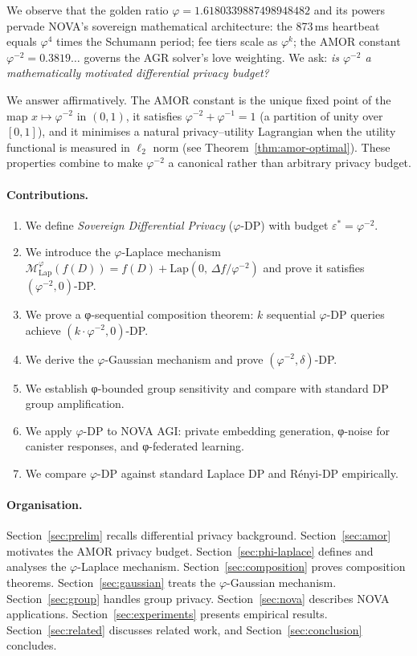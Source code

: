 \documentclass[12pt]{article}
\newcommand{\AMOR}{\varphi^{-2}}
\newcommand{\PHI}{\varphi}
\newcommand{\PHIINV}{\varphi^{-1}}
\newcommand{\Lap}{\mathrm{Lap}}
\newcommand{\eps}{\varepsilon}
\newcommand{\Mech}{\mathcal{M}}
\newcommand{\phiDP}{\varphi\text{-DP}}
\newcommand{\Sens}{\Delta}
\begin{document}
We observe that the golden ratio $\PHI = 1.6180339887498948482$ and its
powers pervade NOVA's sovereign mathematical architecture: the 873\,ms heartbeat
equals $\PHI^4$ times the Schumann period; fee tiers scale as $\PHI^k$; the
AMOR constant $\AMOR = 0.3819\ldots$ governs the AGR solver's love weighting.
We ask: \emph{is $\AMOR$ a mathematically motivated differential privacy budget?}

We answer affirmatively.  The AMOR constant is the unique fixed point of the map
$x \mapsto \PHI^{-2}$ in $(0,1)$, it satisfies $\AMOR + \PHIINV = 1$ (a
partition of unity over $[0,1]$), and it minimises a natural privacy–utility
Lagrangian when the utility functional is measured in $\ell_2$ norm (see
Theorem~\ref{thm:amor-optimal}).  These properties combine to make $\AMOR$ a
canonical rather than arbitrary privacy budget.

\paragraph{Contributions.}
\begin{enumerate}[label=(\roman*)]
  \item We define \emph{Sovereign Differential Privacy} ($\phiDP$) with budget
        $\eps^* = \AMOR$.
  \item We introduce the $\varphi$-Laplace mechanism
        $\Mech_\Lap^\PHI(f(D)) = f(D) + \Lap(0,\, \Sens f / \AMOR)$ and prove
        it satisfies $(\AMOR,0)$-DP.
  \item We prove a φ-sequential composition theorem: $k$ sequential
        $\phiDP$ queries achieve $(k\cdot\AMOR, 0)$-DP.
  \item We derive the $\varphi$-Gaussian mechanism and prove
        $(\AMOR,\delta)$-DP.
  \item We establish φ-bounded group sensitivity and compare with standard DP
        group amplification.
  \item We apply $\phiDP$ to NOVA AGI: private embedding generation, φ-noise
        for canister responses, and φ-federated learning.
  \item We compare $\phiDP$ against standard Laplace DP and Rényi-DP
        empirically.
\end{enumerate}

\paragraph{Organisation.}
Section~\ref{sec:prelim} recalls differential privacy background.
Section~\ref{sec:amor} motivates the AMOR privacy budget.
Section~\ref{sec:phi-laplace} defines and analyses the $\varphi$-Laplace
mechanism.  Section~\ref{sec:composition} proves composition theorems.
Section~\ref{sec:gaussian} treats the $\varphi$-Gaussian mechanism.
Section~\ref{sec:group} handles group privacy.
Section~\ref{sec:nova} describes NOVA applications.
Section~\ref{sec:experiments} presents empirical results.
Section~\ref{sec:related} discusses related work, and
Section~\ref{sec:conclusion} concludes.
\end{document}
